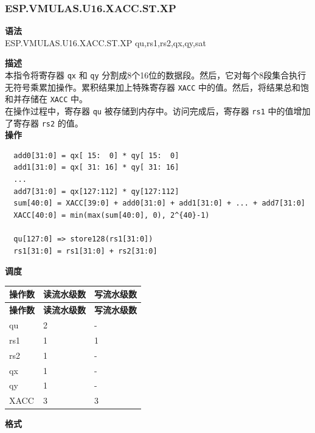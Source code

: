 \newpage

\newpage
\subsubsection{ESP.VMULAS.U16.XACC.ST.XP}\label{instruction:ESPVMULASU16XACCSTXP}
\textbf{语法}\\
ESP.VMULAS.U16.XACC.ST.XP qu,rs1,rs2,qx,qy,sat

\textbf{描述}\\
本指令将寄存器 \lstinline{qx} 和 \lstinline{qy} 分割成8个16位的数据段。然后，它对每个8段集合执行无符号乘累加操作。累积结果加上特殊寄存器 \lstinline{XACC} 中的值。然后，将结果总和饱和并存储在 \lstinline{XACC} 中。\\ 在操作过程中，寄存器 \lstinline{qu} 被存储到内存中。访问完成后，寄存器 \lstinline{rs1} 中的值增加了寄存器 \lstinline{rs2} 的值。\\

\textbf{操作}
\begin{lstlisting}
  add0[31:0] = qx[ 15:  0] * qy[ 15:  0]
  add1[31:0] = qx[ 31: 16] * qy[ 31: 16]
  ...
  add7[31:0] = qx[127:112] * qy[127:112]
  sum[40:0] = XACC[39:0] + add0[31:0] + add1[31:0] + ... + add7[31:0]
  XACC[40:0] = min(max(sum[40:0], 0), 2^{40}-1)

  qu[127:0] => store128(rs1[31:0])
  rs1[31:0] = rs1[31:0] + rs2[31:0]
\end{lstlisting}

\textbf{调度}\\
\begin{longtable}[c]{|l|l|l|}
    \hline
    \rowcolor{lightgray}
    \textbf{操作数} & \textbf{读流水级数} & \textbf{写流水级数} \\\hline
    \endfirsthead
    \hline
    \rowcolor{lightgray}
     \textbf{操作数} & \textbf{读流水级数} & \textbf{写流水级数} \\\hline
    \endhead
    \hline
    \endfoot

    qu & 2 & - \\\hline
    rs1 & 1 & 1 \\\hline
    rs2 & 1 & - \\\hline
     qx & 1 & - \\\hline
     qy & 1 & - \\\hline
     XACC & 3 & 3

\end{longtable}

\textbf{格式}\\


